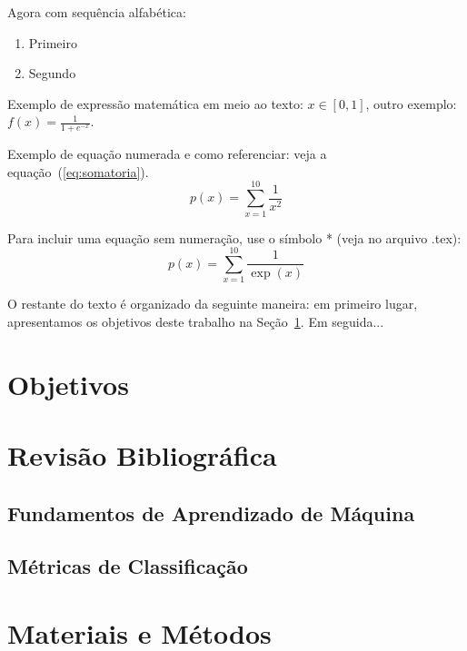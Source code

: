\documentclass[12pt]{article}
\begin{document}
Agora com sequência alfabética:
\begin{enumerate}[label=(\alph*)]
    \item Primeiro
    \item Segundo
\end{enumerate}

Exemplo de expressão matemática em meio ao texto: $x \in [0, 1]$, outro exemplo: $f(x) = \frac{1}{1+e^{-x}}$.

Exemplo de equação numerada e como referenciar: veja a equação~(\ref{eq:somatoria}).
\begin{equation}
    \label{eq:somatoria}
    p(x) = \sum_{x=1}^{10} \frac{1}{x^2}
\end{equation}

Para incluir uma equação sem numeração, use o símbolo * (veja no arquivo .tex):
\begin{equation*}
    \label{eq:somatoria2}
    p(x) = \sum_{x=1}^{10} \frac{1}{\exp({x})}
\end{equation*}


O restante do texto é organizado da seguinte maneira: em primeiro lugar, apresentamos os objetivos deste trabalho na Seção~\ref{sec:objetivo}. Em seguida... 

\section{Objetivos}
\label{sec:objetivo}

\section{Revisão Bibliográfica}
\label{sec:revisao}

\subsection{Fundamentos de Aprendizado de Máquina}
\label{sec:aprendizado}

\subsection{Métricas de Classificação}
\label{sec:metricas}


\section{Materiais e Métodos} 
\label{sec:metodos}
\end{document}
